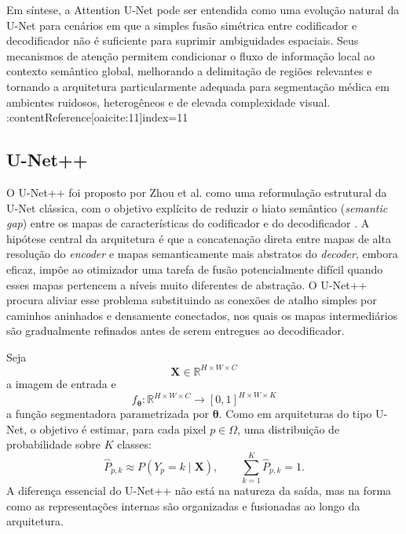 \documentclass[tcc,capa]{texufpel}
\begin{document}
Em síntese, a Attention U-Net pode ser entendida como uma evolução natural da U-Net para cenários em que a simples fusão simétrica entre codificador e decodificador não é suficiente para suprimir ambiguidades espaciais. Seus mecanismos de atenção permitem condicionar o fluxo de informação local ao contexto semântico global, melhorando a delimitação de regiões relevantes e tornando a arquitetura particularmente adequada para segmentação médica em ambientes ruidosos, heterogêneos e de elevada complexidade visual. :contentReference[oaicite:11]{index=11}

\subsection{U-Net++}

O U-Net++ foi proposto por Zhou et al. como uma reformulação estrutural da U-Net clássica, com o objetivo explícito de reduzir o hiato semântico (\textit{semantic gap}) entre os mapas de características do codificador e do decodificador \cite{Zhou2018UNetpp}. A hipótese central da arquitetura é que a concatenação direta entre mapas de alta resolução do \textit{encoder} e mapas semanticamente mais abstratos do \textit{decoder}, embora eficaz, impõe ao otimizador uma tarefa de fusão potencialmente difícil quando esses mapas pertencem a níveis muito diferentes de abstração. O U-Net++ procura aliviar esse problema substituindo as conexões de atalho simples por caminhos aninhados e densamente conectados, nos quais os mapas intermediários são gradualmente refinados antes de serem entregues ao decodificador.

Seja
\begin{equation}
	\mathbf{X} \in \mathbb{R}^{H \times W \times C}
\end{equation}
a imagem de entrada e
\begin{equation}
	f_{\boldsymbol{\theta}} : \mathbb{R}^{H \times W \times C} \rightarrow [0,1]^{H \times W \times K}
\end{equation}
a função segmentadora parametrizada por \(\boldsymbol{\theta}\). Como em arquiteturas do tipo U-Net, o objetivo é estimar, para cada pixel \(p \in \Omega\), uma distribuição de probabilidade sobre \(K\) classes:
\begin{equation}
	\hat{P}_{p,k} \approx P(Y_p = k \mid \mathbf{X}),
	\qquad
	\sum_{k=1}^{K}\hat{P}_{p,k}=1.
\end{equation}
A diferença essencial do U-Net++ não está na natureza da saída, mas na forma como as representações internas são organizadas e fusionadas ao longo da arquitetura.
\end{document}

